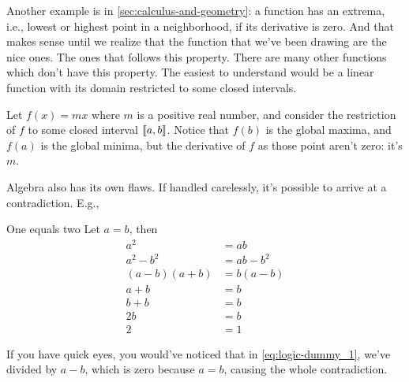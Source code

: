 Another example is in \cref{sec:calculus-and-geometry}: a function has an extrema, i.e., lowest or highest point in a neighborhood, if its derivative is zero. And that makes sense until we realize that the function that we've been drawing are the nice ones. The ones that follows this property. There are many other functions which don't have this property. The easiest to understand would be a linear function with its domain restricted to some closed intervals.

Let \(f(x) = mx\) where \(m\) is a positive real number, and consider the restriction of \(f\) to some closed interval \(\cintv{a, b}\). Notice that \(f(b)\) is the global maxima, and \(f(a)\) is the global minima, but the derivative of \(f\) as those point aren't zero: it's \(m\).

Algebra also has its own flaws. If handled carelessly, it's possible to arrive at a contradiction. E.g.,
\begin{exmp}{One equals two}{}
  Let \(a = b\), then
  \begin{align}
    a^2            & = ab                                \\
    a^2 - b^2      & = ab - b^2                          \\
    (a - b)(a + b) & = b(a - b)                          \\
    a + b          & = b        \label{eq:logic-dummy_1} \\
    b + b          & = b                                 \\
    2b             & = b                                 \\
    2              & = 1
  \end{align}
\end{exmp}
If you have quick eyes, you would've noticed that in \cref{eq:logic-dummy_1}, we've divided by \(a - b\), which is zero because \(a = b\), causing the whole contradiction.

